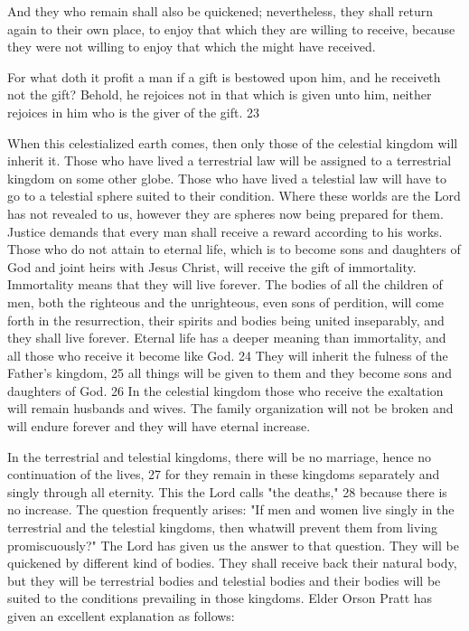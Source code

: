 And they who remain shall also be quickened; nevertheless, they shall return again to their
own place, to enjoy that which they are willing to receive, because they were not willing to
enjoy that which the might have received.

For what doth it profit a man if a gift is bestowed upon him, and he receiveth not the gift?
Behold, he rejoices not in that which is given unto him, neither rejoices in him who is the
giver of the gift. 23

When this celestialized earth comes, then only those of the celestial kingdom will inherit it.
Those who have lived a terrestrial law will be assigned to a terrestrial kingdom on some other
globe. Those who have lived a telestial law will have to go to a telestial sphere suited to their
condition. Where these worlds are the Lord has not revealed to us, however they are spheres
now being prepared for them. Justice demands that every man shall receive a reward
according to his works. Those who do not attain to eternal life, which is to become sons and
daughters of God and joint heirs with Jesus Christ, will receive the gift of immortality.
Immortality means that they will live forever. The bodies of all the children of men, both the
righteous and the unrighteous, even sons of perdition, will come forth in the resurrection,
their spirits and bodies being united inseparably, and they shall live forever. Eternal life has a
deeper meaning than immortality, and all those who receive it become like God. 24 They will
inherit the fulness of the Father's kingdom, 25 all things will be given to them and they
become sons and daughters of God. 26 In the celestial kingdom those who receive the
exaltation will remain husbands and wives. The family organization will not be broken and
will endure forever and they will have eternal increase.

In the terrestrial and telestial kingdoms, there will be no marriage, hence no continuation of
the lives, 27 for they remain in these kingdoms separately and singly through all eternity.
This the Lord calls "the deaths," 28 because there is no increase. The question frequently
arises: "If men and women live singly in the terrestrial and the telestial kingdoms, then whatwill prevent them from living promiscuously?" The Lord has given us the answer to that
question. They will be quickened by different kind of bodies. They shall receive back their
natural body, but they will be terrestrial bodies and telestial bodies and their bodies will be
suited to the conditions prevailing in those kingdoms. Elder Orson Pratt has given an
excellent explanation as follows:


